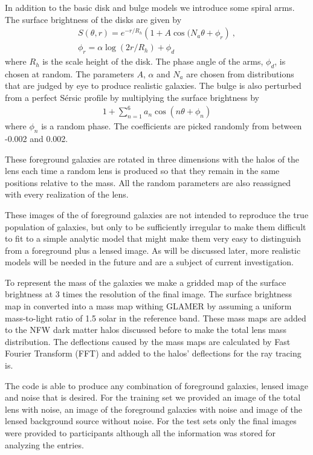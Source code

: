 \documentclass[useAMS,usenatbib]{mnras}
\begin{document}
In addition to the basic disk and bulge models we introduce some spiral arms.  The surface brightness of 
the disks are given by
\begin{align}
S(\theta,r) = e^{-r/R_h} \left( 1 + A \cos(N_a\theta + \phi_r \right) ~, \\
\phi_r = \alpha\log(2 r/ R_h) + \phi_d \nonumber
\end{align}
where $R_h$ is the scale height of the disk.  The phase angle of the arms, $\phi_d$, is chosen at random.  The parameters $A$, $\alpha$ and $N_a$ are chosen from distributions that are judged by eye to produce realistic 
galaxies.
The bulge is also perturbed from a perfect S\'{e}rsic profile by multiplying the surface brightness by
\begin{align}
1+\sum_{n=1}^6 a_n \cos\left( n \theta  + \phi_n \right)
\end{align}
where $\phi_n$ is a random phase.  The coefficients are picked randomly from between -0.002 and 0.002. 

These foreground galaxies are rotated in three dimensions with the halos of the lens each time a random lens is produced so that they remain in the same positions relative to the mass.  All the random parameters are also reassigned with every realization of the lens.

These images of the of foreground galaxies are not intended to reproduce the true population of galaxies, but only to be sufficiently irregular to make them difficult to fit to a simple analytic model that might make them very easy to distinguish from a foreground plus a lensed image.   As will be discussed later, more realistic models will be needed in the future and are a subject of current investigation.

To represent the mass of the galaxies we make a gridded map of the surface brightness at 3 times the resolution of the final image.  The surface brightness map in converted into a mass map withing GLAMER by assuming a uniform mass-to-light ratio of 1.5 solar in the reference band.  These mass maps are added to the NFW dark matter halos discussed before to make the total lens mass distribution.  The deflections caused by the mass maps are calculated by Fast Fourier Transform (FFT) and added to the halos'  deflections for the ray tracing is. 

The code is able to produce any combination of foreground galaxies, lensed image and noise that is desired.  For the training set we provided an image of the total lens with noise, an image of the foreground galaxies with noise and image of the lensed background source without noise.
For the test sets only the final images were provided to participants although all the information was stored for analyzing the entries.
\end{document}
